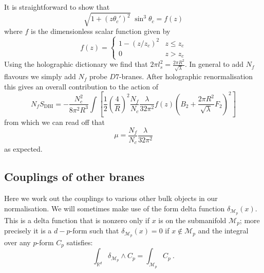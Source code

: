 \documentclass[aps,preprint,nofootinbib,preprintnumbers,eqsecnum,superscriptaddress]{revtex4}
\newcommand\sM{{\ensuremath{{\mathcal M}}}}
\begin{document}
\begin{appendix}
It is straightforward to show that
\begin{equation}
	\sqrt{1 + (z\theta_c')^2} \; \sin^3{\theta_c} = f(z)
\end{equation}
where $f$ is the dimensionless scalar function given by
\begin{equation}
	f(z) = 
	\begin{cases} 
	1 - (z/z_c)^2	& z\leq z_c \\
	0				& z > z_c
	\end{cases}
\end{equation}
Using the holographic dictionary we find that $2\pi l_s^2 = \frac{2 \pi R^2}{\sqrt{\lambda}}$. In general to add $N_f$ flavours we simply add $N_f$ probe $D7$-branes. After holographic renormalisation this gives an overall contribution to the action of
\begin{equation}
N_f S_{\text{DBI}}
= -\frac{N_c^2}{8 \pi^2 R^3} \int{\left[\frac{1}{2}\left(\frac{4}{R}\right)^2 \frac{N_f}{N_c} \frac{\lambda}{32 \pi^2} f(z)\left(B_2 + \frac{2 \pi R^2}{\sqrt{\lambda}}F_2\right)^2\right]}
\end{equation}
from which we can read off that
\begin{equation}
	\mu = \frac{N_f}{N_c} \frac{\lambda}{32 \pi^2}
\end{equation}
as expected.

\subsection{Couplings of other branes}
Here we work out the couplings to various other bulk objects in our normalisation. We will sometimes make use of the form delta function $\delta_{\sM_p}(x)$. This is a delta function that is nonzero only if $x$ is on the submanifold $\sM_p$; more precisely it is a $d-p$-form such that $\delta_{\sM_p}(x) = 0$ if $x \notin \sM_p$ and the integral over any $p$-form $C_p$ satisfies:
\begin{equation}
\int_{\mathbb{R}^d} \delta_{\sM_p} \wedge C_p = \int_{\sM_p} C_p \ . 
\end{equation}

\end{appendix}
\end{document}
